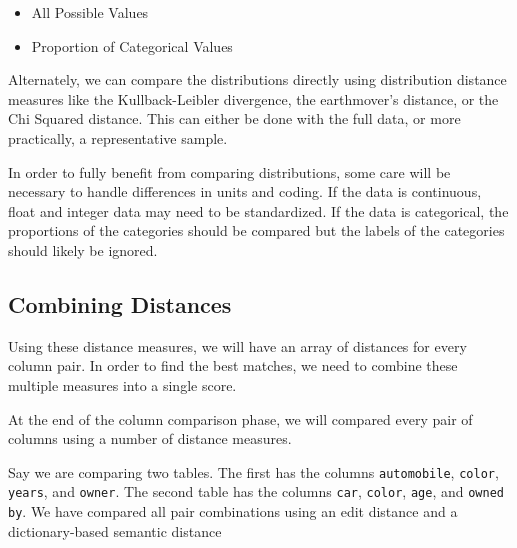 \documentclass{datamade}
\theoremstyle{definition}
\theoremstyle{remark}
\begin{document}
\begin{itemize}
\item All Possible Values
\item Proportion of Categorical Values 
\end{itemize}

Alternately, we can compare the distributions directly using
distribution distance measures like the Kullback-Leibler divergence,
the earthmover's distance, or the Chi Squared distance. This can
either be done with the full data, or more practically, a representative
sample.

In order to fully benefit from comparing distributions, some care will
be necessary to handle differences in units and coding. If the data is
continuous, float and integer data may need to be standardized. If the
data is categorical, the proportions of the categories should be
compared but the labels of the categories should likely be ignored.

\subsection*{Combining Distances}
Using these distance measures, we will have an array of distances for
every column pair. In order to find the best matches, we need to
combine these multiple measures into a single score.

At the end of the column comparison phase, we will compared
every pair of columns using a number of distance measures. 

Say we are comparing two tables. The first has the columns
\verb+automobile+, \verb+color+, \verb+years+, and \verb+owner+. The
second table has the columns \verb+car+, \verb+color+, \verb+age+,
and \verb+owned by+. We have compared all pair combinations using an
edit distance and a dictionary-based semantic distance
\end{document}
